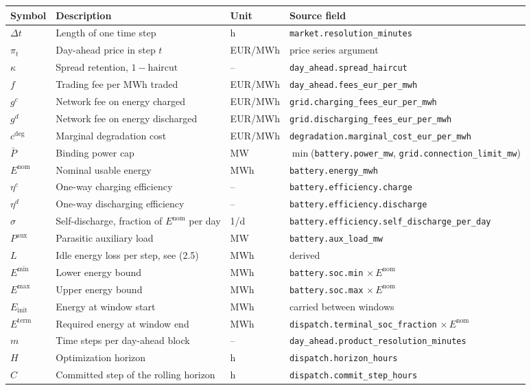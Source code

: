 \documentclass[11pt,a4paper]{article}
\numberwithin{equation}{section}
\begin{document}
\small
\begin{tabular}{@{}l >{\raggedright\arraybackslash}p{4.4cm} l >{\raggedright\arraybackslash}p{5.6cm}@{}}
\toprule
Symbol & Description & Unit & Source field \\
\midrule
$\Delta t$   & Length of one time step & h & \nolinkurl{market.resolution_minutes} \\
$\pi_t$      & Day-ahead price in step $t$ & EUR/MWh & price series argument \\
$\kappa$     & Spread retention, $1 - \text{haircut}$ & -- & \nolinkurl{day_ahead.spread_haircut} \\
$f$          & Trading fee per MWh traded & EUR/MWh & \nolinkurl{day_ahead.fees_eur_per_mwh} \\
$g^{c}$      & Network fee on energy charged & EUR/MWh & \nolinkurl{grid.charging_fees_eur_per_mwh} \\
$g^{d}$      & Network fee on energy discharged & EUR/MWh & \nolinkurl{grid.discharging_fees_eur_per_mwh} \\
$c^{\deg}$   & Marginal degradation cost & EUR/MWh & \nolinkurl{degradation.marginal_cost_eur_per_mwh} \\
$\bar{P}$    & Binding power cap & MW & $\min$(\nolinkurl{battery.power_mw}, \nolinkurl{grid.connection_limit_mw}) \\
$E^{\text{nom}}$ & Nominal usable energy & MWh & \nolinkurl{battery.energy_mwh} \\
$\eta^{c}$   & One-way charging efficiency & -- & \nolinkurl{battery.efficiency.charge} \\
$\eta^{d}$   & One-way discharging efficiency & -- & \nolinkurl{battery.efficiency.discharge} \\
$\sigma$     & Self-discharge, fraction of $E^{\text{nom}}$ per day & 1/d & \nolinkurl{battery.efficiency.self_discharge_per_day} \\
$P^{\text{aux}}$ & Parasitic auxiliary load & MW & \nolinkurl{battery.aux_load_mw} \\
$L$          & Idle energy loss per step, see (2.5) & MWh & derived \\
$E^{\min}$   & Lower energy bound & MWh & \nolinkurl{battery.soc.min} $\times\, E^{\text{nom}}$ \\
$E^{\max}$   & Upper energy bound & MWh & \nolinkurl{battery.soc.max} $\times\, E^{\text{nom}}$ \\
$E_{\text{init}}$ & Energy at window start & MWh & carried between windows \\
$E^{\text{term}}$ & Required energy at window end & MWh & \nolinkurl{dispatch.terminal_soc_fraction} $\times\, E^{\text{nom}}$ \\
$m$          & Time steps per day-ahead block & -- & \nolinkurl{day_ahead.product_resolution_minutes} \\
$H$          & Optimization horizon & h & \nolinkurl{dispatch.horizon_hours} \\
$C$          & Committed step of the rolling horizon & h & \nolinkurl{dispatch.commit_step_hours} \\
\bottomrule
\end{tabular}
\normalsize
\end{document}
